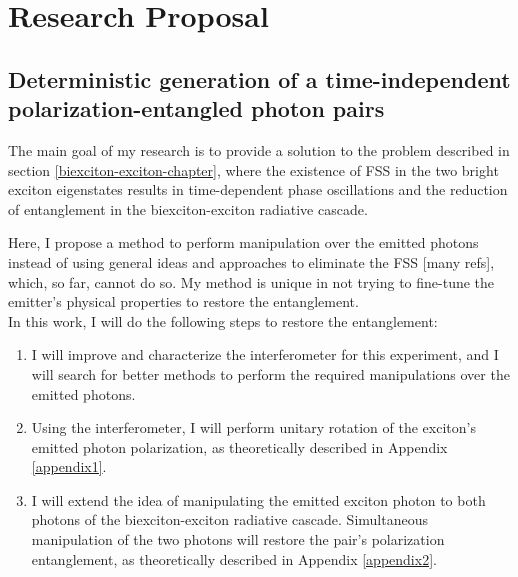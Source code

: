 \section{Research Proposal}
\subsection{Deterministic generation of a time-independent polarization-entangled photon pairs}
The main goal of my research is to provide a solution to the problem described in section \ref{biexciton-exciton-chapter}, where the existence of FSS in the two bright exciton eigenstates results in time-dependent phase oscillations and the reduction of entanglement in the biexciton-exciton radiative cascade.
\iffalse
The presence of the splitting in the lowest excitonic state is an unwanted effect in QDs that causes a degradation in the degree of entanglement between the two photons in the biexciton-exciton radiative cascade by lifting the degeneracy of the levels\cite{Winik2017}. This is due to several causes but mainly as a result of the asymmetry of the QD.$\newline$
\fi
Here, I propose a method to perform manipulation over the emitted photons instead of using general ideas and approaches to eliminate the FSS [many refs], which, so far, cannot do so. My method is unique in not trying to fine-tune the emitter's physical properties to restore the entanglement.\\
In this work, I will do the following steps to restore the entanglement:
\begin{enumerate}
	\item  I will improve and characterize the interferometer for this experiment, and I will search for better methods to perform the required manipulations over the emitted photons. 
	\item Using the interferometer, I will perform unitary rotation of the exciton's emitted photon polarization,  as theoretically described in Appendix \ref{appendix1}.

	\item I will extend the idea of manipulating the emitted exciton photon to both photons of the biexciton-exciton radiative cascade. Simultaneous manipulation of the two photons will restore the pair's polarization entanglement, as theoretically described in Appendix \ref{appendix2}.
\end{enumerate} 

